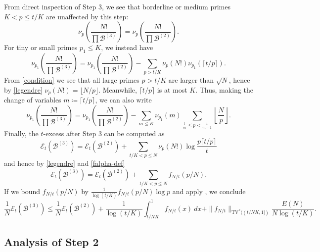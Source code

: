 \documentclass[12pt,a4paper,reqno]{amsart}
\numberwithin{equation}{section}
\theoremstyle{plain}
\theoremstyle{definition}
\newcommand\tuple{{\mathcal B}}
\newcommand\excess{{\mathcal{E}}}
\begin{document}
From direct inspection of Step 3, we see that  borderline or medium primes $K < p \leq t/K$ are unaffected by this step:
\begin{equation}\label{step3-unaffected}
  \nu_p\left(\frac{N!}{\prod \tuple^{(3)}}\right) = \nu_p\left(\frac{N!}{\prod \tuple^{(2)}}\right).
\end{equation}
For tiny or small primes $p_1 \leq K$, we instead have
$$
\nu_{p_1}\left(\frac{N!}{\prod \tuple^{(3)}}\right) = \nu_{p_1}\left(\frac{N!}{\prod \tuple^{(2)}}\right) - \sum_{p > t/K} \nu_p(N!) \nu_{p_1}( \lceil t/p \rceil ).$$
From \eqref{condition} we see that all large primes $p>t/K$ are larger than $\sqrt{N}$, hence by \eqref{legendre} $\nu_p(N!) = \lfloor N/p\rfloor$.  Meanwhile, $\lceil t/p \rceil$ is at most $K$.  Thus, making the change of variables $m \coloneqq \lceil t/p \rceil$, we can also write
\begin{equation}\label{step3-affected}
\nu_{p_1}\left(\frac{N!}{\prod \tuple^{(3)}}\right) = \nu_{p_1}\left(\frac{N!}{\prod \tuple^{(2)}}\right) - \sum_{m \leq K} \nu_{p_1}(m) \sum_{\frac{t}{m} \leq p < \frac{t}{m-1}} \left\lfloor \frac{N}{p} \right\rfloor.
\end{equation}
Finally, the $t$-excess after Step 3 can be computed as
$$
\excess_t(\tuple^{(3)}) = 
\excess_t(\tuple^{(2)}) + \sum_{t/K < p \leq N} \nu_p(N!) \log \frac{p \lceil t/p \rceil}{t}$$
and hence by \eqref{legendre} and \eqref{falpha-def}
$$
\excess_t(\tuple^{(3)}) = 
\excess_t(\tuple^{(2)}) + \sum_{t/K < p \leq N} f_{N/t}(p/N).$$
If we bound $f_{N/t}(p/N)$ by $\frac{1}{\log(t/K)} f_{N/t}(p/N) \log p$ and apply , we conclude
\begin{equation}\label{step3-excess}
\frac{1}{N} \excess_t(\tuple^{(3)}) \leq 
 \frac{1}{N}\excess_t(\tuple^{(2)}) + \frac{1}{\log(t/K)} \int_{t/NK}^1 f_{N/t}(x)\ dx + \|f_{N/t}\|_{\mathrm{TV}^*((t/NK,1])} \frac{E(N)}{N \log(t/K)}.  
\end{equation}


\subsection{Analysis of Step 2}
\end{document}
